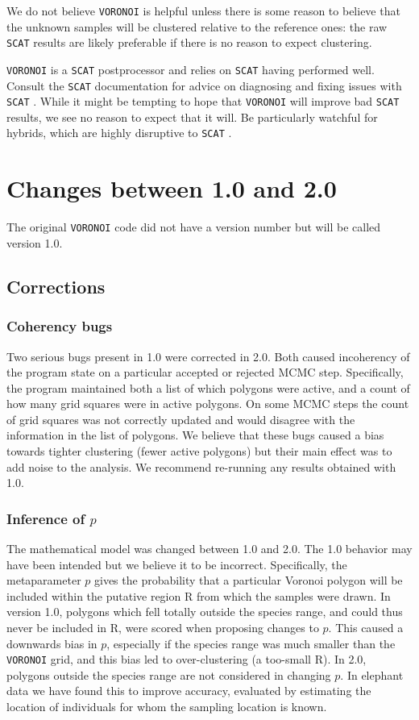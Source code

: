 \documentclass[10pt,titlepage,times,letterpaper]{article}
\def\SCAT{{\tt SCAT} }
\def\VORONOI{{\tt VORONOI} }
\begin{document}
We do not believe \VORONOI is helpful unless there is some reason to believe that the
unknown samples will be clustered relative to the reference ones:  the raw \SCAT results
are likely preferable if there is no reason to expect clustering.

\VORONOI is a \SCAT postprocessor and relies on \SCAT having performed well.
Consult the \SCAT documentation for advice on diagnosing and fixing issues with \SCAT.
While it might be tempting to hope that \VORONOI will improve bad \SCAT results, we
see no reason to expect that it will.  Be particularly watchful for hybrids, which are
highly disruptive to \SCAT.

\section{Changes between 1.0 and 2.0} \label{changes}

The original \VORONOI code did not have a version number but will be called version 1.0.

\subsection{Corrections}

\subsubsection{Coherency bugs}  
Two serious bugs present in 1.0 were corrected in 2.0.  Both 
caused incoherency of the program state on a particular accepted or rejected MCMC
step.  Specifically, the program maintained both a list of which polygons were
active, and a count of how many grid squares were in active polygons.
On some MCMC steps the count of grid squares was not correctly updated and would
disagree with the information in the list of polygons.  We believe that these bugs 
caused a bias towards tighter clustering (fewer active polygons) but their main effect was
to add noise to the analysis.  We recommend re-running any results obtained with 1.0.

\subsubsection{ Inference of $p$} 
The mathematical model was changed between 1.0 and 2.0.   
The 1.0 behavior may have been
intended but we believe it to be incorrect.   Specifically, the metaparameter
$p$ gives the probability that a particular Voronoi polygon will be included within
the putative region R from which the samples were drawn.  In version 1.0, polygons which
fell totally outside the species range, and could thus never be included in R,
were scored when proposing changes to $p$.  This caused a downwards bias in $p$,
especially if the species range was much smaller than the \VORONOI grid, and this bias
led to over-clustering (a too-small R).  In 2.0, polygons outside the species range
are not considered in changing $p$.  In elephant data we have found this to improve
accuracy, evaluated by estimating the location of individuals for whom the sampling
location is known. 
\end{document}
